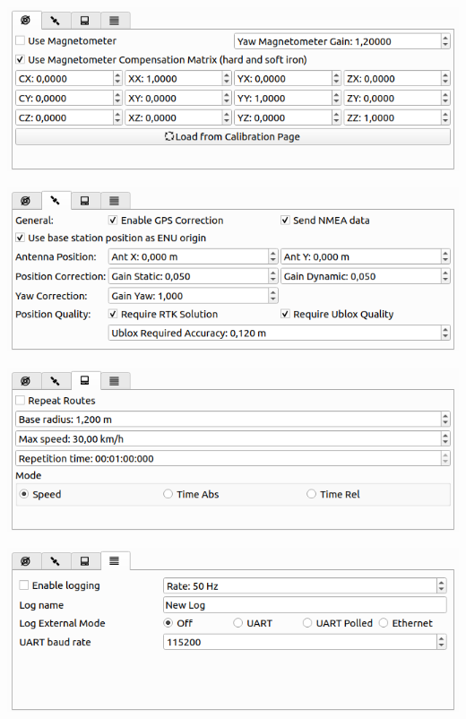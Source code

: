 \documentclass[12pt]{article} %
\begin{document}
\noindent\begin{minipage}{0.4\textwidth}
\noindent \includegraphics[width=\textwidth]{./screens/car_settings_mag.png}

\vspace{12mm}

\noindent \includegraphics[width=\textwidth]{./screens/car_settings_gps.png}

\vspace{12mm}

\noindent \includegraphics[width=\textwidth]{./screens/car_settings_auto.png}

\vspace{12mm}

\noindent \includegraphics[width=\textwidth]{./screens/car_settings_log.png}
\end{minipage}
\end{document}

